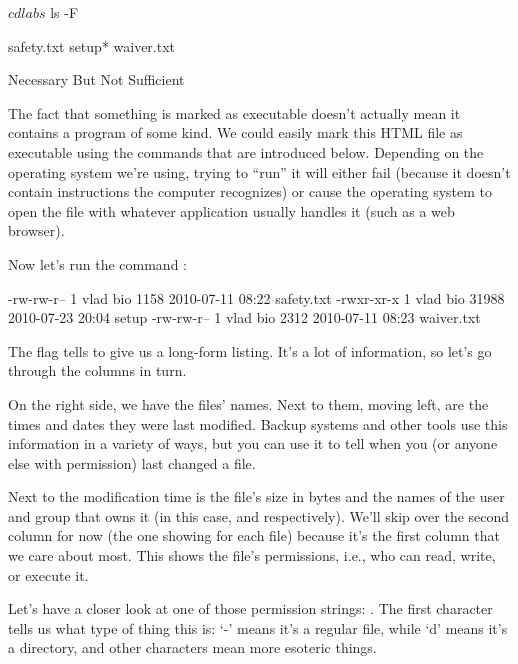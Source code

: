 \begin{VerbIn}
$ cd labs
$ ls -F
\end{VerbIn}

\begin{VerbOut}
safety.txt    setup*     waiver.txt
\end{VerbOut}

\begin{swcbox}{Necessary But Not Sufficient}

The fact that something is marked as executable doesn't actually mean it
contains a program of some kind. We could easily mark this HTML file as
executable using the commands that are introduced below. Depending on
the operating system we're using, trying to ``run'' it will either fail
(because it doesn't contain instructions the computer recognizes) or
cause the operating system to open the file with whatever application
usually handles it (such as a web browser).

\end{swcbox}

Now let's run the command :


\begin{VerbOut}
-rw-rw-r-- 1 vlad bio  1158  2010-07-11 08:22 safety.txt
-rwxr-xr-x 1 vlad bio 31988  2010-07-23 20:04 setup
-rw-rw-r-- 1 vlad bio  2312  2010-07-11 08:23 waiver.txt
\end{VerbOut}

The  flag tells  to give us a long-form listing.
It's a lot of information, so let's go through the columns in turn.

On the right side, we have the files' names. Next to them, moving left,
are the times and dates they were last modified. Backup systems and
other tools use this information in a variety of ways, but you can use
it to tell when you (or anyone else with permission) last changed a
file.

Next to the modification time is the file's size in bytes and the names
of the user and group that owns it (in this case,  and
 respectively). We'll skip over the second column for now
(the one showing  for each file) because it's the first column
that we care about most. This shows the file's permissions, i.e., who
can read, write, or execute it.

Let's have a closer look at one of those permission strings:
. The first character tells us what type of thing
this is: `-' means it's a regular file, while `d' means it's a
directory, and other characters mean more esoteric things.

